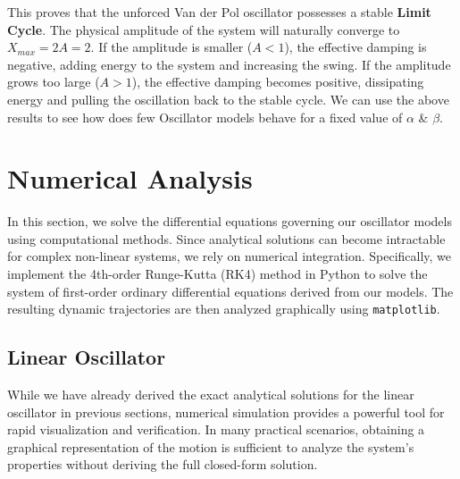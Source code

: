 \documentclass[10pt,twoside]{report}
\begin{document}
This proves that the unforced Van der Pol oscillator possesses a stable \textbf{Limit Cycle}. The physical amplitude of the system will naturally converge to $X_{max} = 2A = 2$. If the amplitude is smaller ($A < 1$), the effective damping is negative, adding energy to the system and increasing the swing. If the amplitude grows too large ($A > 1$), the effective damping becomes positive, dissipating energy and pulling the oscillation back to the stable cycle.
We can use the above results to see how does few Oscillator models behave for a fixed value of $\alpha$ \& $\beta$.

\newpage
\chapter{Numerical Analysis}
In this section, we solve the differential equations governing our oscillator models using computational methods. Since analytical solutions can become intractable for complex non-linear systems, we rely on numerical integration. Specifically, we implement the 4th-order Runge-Kutta (RK4) method in Python to solve the system of first-order ordinary differential equations derived from our models. The resulting dynamic trajectories are then analyzed graphically using \texttt{matplotlib}.

\section{Linear Oscillator}
While we have already derived the exact analytical solutions for the linear oscillator in previous sections, numerical simulation provides a powerful tool for rapid visualization and verification. In many practical scenarios, obtaining a graphical representation of the motion is sufficient to analyze the system's properties without deriving the full closed-form solution.
\end{document}
